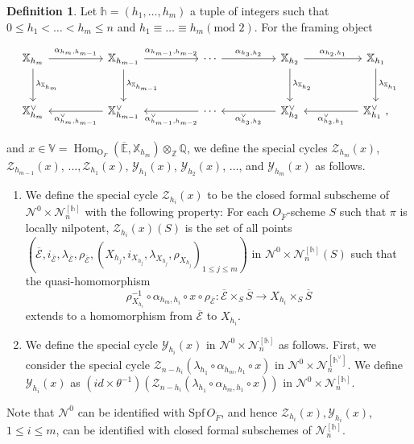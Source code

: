 \documentclass[11pt,oneside]{amsart}
\DeclareMathOperator{\Hom}{Hom}
\renewcommand{\O}{\mathrm{O}}
\theoremstyle{plain}
\theoremstyle{definition}
\newtheorem{definition}[theorem]{Definition}
\theoremstyle{remark}
\newcommand{\tx}[1]{\text{#1}}
\newcommand{\BE}{{\mathbb E}}
\newcommand{\BQ}{{\mathbb Q}}
\newcommand{\BV}{{\mathbb V}}
\newcommand{\BX}{{\mathbb X}}
\newcommand{\BZ}{{\mathbb Z}}
\newcommand{\CE}{{\mathcal E}}
\newcommand{\CN}{{\mathcal N}}
\newcommand{\CY}{{\mathcal Y}}
\newcommand{\CZ}{{\mathcal Z}}
\newcommand{\Spf}{\mathrm{Spf}\, }
\numberwithin{equation}{section}
\begin{document}
	\begin{definition}\label{definition3.3.6}
		Let $\mathds{h}=(h_1,\dots,h_m)$ a tuple of integers such that $0\leq h_1<\dots<h_m \leq n$ and $h_1 \equiv \dots \equiv h_m (\tx{mod } 2)$. For the framing object
		
		\[
		\begin{tikzcd}[column sep=1.7cm, row sep=1cm]
			\BX_{h_m} \arrow{r}{\alpha_{h_m,h_{m-1}}} \arrow{d}{\lambda_{\BX_{h_{m}}}}
			&
			\BX_{h_{m-1}} \arrow{r}{\alpha_{h_{m-1},h_{m-2}}} \arrow{d}{\lambda_{\BX_{h_{m-1}}}}
			&
			\cdots \arrow{r}{\alpha_{h_{3},h_{2}}}
			&
			\BX_{h_{2}} \arrow{r}{\alpha_{h_{2},h_{1}}} \arrow{d}{\lambda_{\BX_{h_{2}}}}
			&
			\BX_{h_{1}} \arrow{d}{\lambda_{\BX_{h_{1}}}}
			\\
			\BX_{h_{m}}^{\vee}
			&
			\BX_{h_{m-1}}^{\vee} \arrow{l}{\alpha_{h_{m},h_{m-1}}^{\vee}}
			&
			\cdots \arrow{l}{\alpha_{h_{m-1},h_{m-2}}^{\vee}}
			&
			\BX_{h_{2}}^{\vee} \arrow{l}{\alpha_{h_{3},h_{2}}^{\vee}}
			&
			\BX_{h_{1}}^{\vee}\arrow{l}{\alpha_{h_{2},h_{1}}^{\vee}}\tx{ },
		\end{tikzcd}
		\]
		
		and $x \in \BV=\Hom_{\O_F}(\overline{\BE},\BX_{h_m})\otimes_{\BZ}\BQ$, we define the special cycles $\CZ_{h_m}(x)$, $\CZ_{h_{m-1}}(x)$, $\dots,\CZ_{h_1}(x)$, $\CY_{h_1}(x)$, $\CY_{h_2}(x)$, $\dots$, and $\CY_{h_m}(x)$ as follows.
		\begin{enumerate}
			\item We define the special cycle $\CZ_{h_i}(x)$ to be the closed formal subscheme of $\CN^0 \times \CN^{[\mathds{h}]}_{n}$ with the following property:
			For each $O_{\breve{F}}$-scheme $S$ such that $\pi$ is locally nilpotent, $\CZ_{h_i}(x)(S)$ is the set of all points $(\overline{\CE},i_{\overline{\CE}},\lambda_{\overline{\CE}},\rho_{\overline{\CE}},(X_{h_j},i_{X_{h_j}},\lambda_{X_{h_j}},\rho_{X_{h_j}})_{1 \leq j \leq m})$ in $\CN^0 \times \CN^{[\mathds{h}]}_{n}(S)$ such that the quasi-homomorphism
			\begin{equation*}
				\rho_{X_{h_i}}^{-1} \circ \alpha_{h_m,h_i} \circ x \circ \rho_{\overline{\CE}}:\overline{\CE} \times_S \overline{S} \rightarrow X_{h_i} \times_S \overline{S}
			\end{equation*}
			extends to a homomorphism from $\overline{\CE}$ to $X_{h_i}$.
			
			\item We define the special cycle $\CY_{h_i}(x)$ in $\CN^0 \times \CN^{[\mathds{h}]}_{n}$ as follows. First, we consider the special cycle $\CZ_{n-h_i}(\lambda_{h_1}\circ \alpha_{h_m,h_1}\circ x)$ in $\CN^0 \times \CN^{[\mathds{h}^{\vee}]}_n$. We define $\CY_{h_i}(x)$ as $(id \times \theta^{-1})(\CZ_{n-h_i}(\lambda_{h_1}\circ \alpha_{h_m,h_1}\circ x))$ in $\CN^0 \times \CN^{[\mathds{h}]}_n$.
		\end{enumerate}
		
		Note that $\CN^0$ can be identified with $\Spf O_{\breve{F}}$, and hence $\CZ_{h_i}(x), \CY_{h_i}(x)$, $1 \leq i \leq m$, can be identified with closed formal subschemes of $\CN_n^{[\mathds{h}]}$.
	\end{definition}
	
\end{document}
